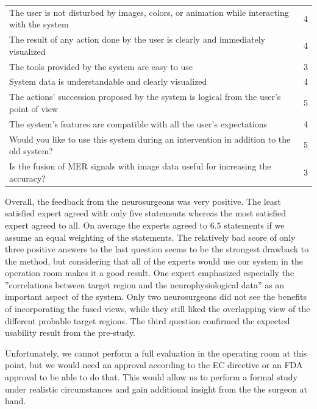 \documentclass{egpubl}
\begin{document}
\noindent \begin{tabular}{p{} c}
\hline
The user is not disturbed by images, colors, or animation while interacting with the system	& 4\\
The result of any action done by the user is clearly and immediately visualized				& 4\\
The tools provided by the system are easy to use												& 3\\
System data is understandable and clearly visualized											& 4\\
The actions' succession proposed by the system is logical from the user's point of view		& 5\\
The system's features are compatible with all the user's expectations							& 4\\
Would you like to use this system during an intervention in addition to the old system?		& 5\\
Is the fusion of MER signals with image data useful for increasing the accuracy?				& 3\\
\hline
\end{tabular}


Overall, the feedback from the neurosurgeons was very positive. The least satisfied expert agreed with only five statements whereas the most satisfied expert agreed to all. On average the experts agreed to $6.5$ statements if we assume an equal weighting of the statements. The relatively bad score of only three positive answers to the last question seems to be the strongest drawback to the method, but considering that all of the experts would use our system in the operation room makes it a good result. One expert emphasized especially the ''correlations between target region and the neurophysiological data'' as an important aspect of the system. Only two neurosurgeons did not see the benefits of incorporating the fused views, while they still liked the overlapping view of the different probable target regions. The third question confirmed the expected usability result from the pre-study.

Unfortunately, we cannot perform a full evaluation in the operating room at this point, but we would need an approval according to the EC directive or an FDA approval to be able to do that. This would allow us to perform a formal study under realistic circumstances and gain additional insight from the the surgeon at hand.
\end{document}
